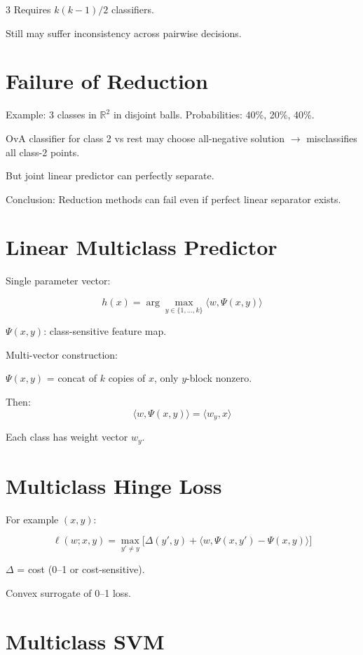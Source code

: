 \documentclass[8pt,fleqn]{extarticle}
\begin{document}
\begin{multicols}{3}
Requires $k(k-1)/2$ classifiers.

Still may suffer inconsistency across pairwise decisions.


\section*{Failure of Reduction}

Example: 3 classes in $\mathbb R^2$ in disjoint balls.
Probabilities: 40\%, 20\%, 40\%.

OvA classifier for class 2 vs rest
may choose all-negative solution
$\to$ misclassifies all class-2 points.

But joint linear predictor can perfectly separate.

Conclusion:
Reduction methods can fail
even if perfect linear separator exists.


\section*{Linear Multiclass Predictor}

Single parameter vector:

\[
h(x)=\arg\max_{y\in\{1,\dots,k\}}
\langle w,\Psi(x,y)\rangle
\]

$\Psi(x,y)$: class-sensitive feature map.

Multi-vector construction:

$\Psi(x,y)$ = concat of $k$ copies of $x$,
only $y$-block nonzero.

Then:
\[
\langle w,\Psi(x,y)\rangle=\langle w_y,x\rangle
\]

Each class has weight vector $w_y$.


\section*{Multiclass Hinge Loss}

For example $(x,y)$:

\[
\ell(w;x,y)
=
\max_{y'\neq y}
\Big[
\Delta(y',y)
+
\langle w,
\Psi(x,y')-\Psi(x,y)
\rangle
\Big]
\]

$\Delta$ = cost (0--1 or cost-sensitive).

Convex surrogate of 0--1 loss.


\section*{Multiclass SVM}


\end{multicols}
\end{document}
